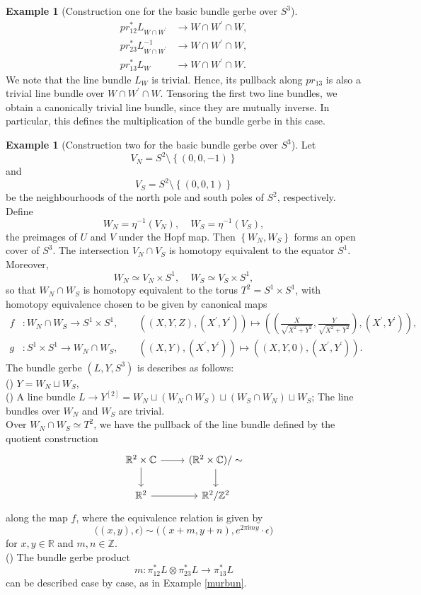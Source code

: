 \documentclass{article}
\theoremstyle{plain}
\theoremstyle{definition}
\newtheorem{exa}[thm]{Example}
\newcommand{\rNum}[1]{\lowercase\expandafter{\romannumeral #1\relax}}
\begin{document}
\begin{exa}[Construction one for the basic bundle gerbe over $S^3$]
\begin{align*}
pr_{12}^*L_{W \cap W^\prime} & \longrightarrow W \cap W^\prime \cap W, \\
pr_{23}^*L^{-1}_{W \cap W^\prime} & \longrightarrow W \cap W^\prime \cap W, \\
pr_{13}^*L_{W} & \longrightarrow W \cap W^\prime \cap W.
\end{align*}
We note that the line bundle $L_W$ is trivial. Hence, its pullback along $pr_{13}$ is also a trivial line bundle over $W \cap W^\prime \cap W$. Tensoring the first two line bundles, we obtain a canonically trivial line bundle, since they are mutually inverse. In particular, this defines the multiplication of the bundle gerbe in this case.
\end{exa}
\begin{exa}[Construction two for the basic bundle gerbe over $S^3$]\label{ourbun}
Let $$V_N = S^2 \setminus \left\{(0,0,-1)\right\}$$ and $$V_S = S^2 \setminus \left\{(0,0,1)\right\}$$ be the neighbourhoods of the north pole and south poles of $S^2$, respectively. Define
$$W_N = \eta^{-1}(V_N), ~~~~~ W_S = \eta^{-1}(V_S),$$
the preimages of $U$ and $V$ under the Hopf map. Then $\left\{W_N,W_S\right\}$ forms an open cover of $S^3$. The intersection $V_N \cap V_S$ is homotopy equivalent to the equator $S^1$. Moreover,
\[
W_N \simeq V_N \times S^1, ~~~~~ W_S \simeq V_S \times S^1,
\]
so that $W_N \cap W_S$ is homotopy equivalent to the torus $T^2 = S^1 \times S^1$, with homotopy equivalence chosen to be given by canonical maps
\begin{align*}
f &: W_N \cap W_S \longrightarrow S^1 \times S^1, \qquad
\left((X,Y,Z),(X^\prime,Y^\prime)\right) \longmapsto
\left(
(\frac{X}{\sqrt{X^2+Y^2}},
\frac{Y}{\sqrt{X^2+Y^2}}),
(X^\prime,Y^\prime)
\right), \\
g &: S^1 \times S^1 \longrightarrow W_N \cap W_S, \qquad
\left((X,Y),(X^\prime,Y^\prime)\right) \longmapsto \left((X,Y,0),(X^\prime,Y^\prime)\right).
\end{align*}
The bundle gerbe $(L,Y,S^3)$ is describes as follows: \\
(\rNum{1}) $Y = W_N \sqcup W_S$, \\
(\rNum{2}) A line bundle $L \longrightarrow Y^{[2]} = W_N \sqcup (W_N \cap W_S) \sqcup (W_S \cap W_N) \sqcup W_S$; The line bundles over $W_N$ and $W_S$ are trivial. \\
Over $W_N \cap W_S \simeq T^2$, we have the pullback of the line bundle defined by the quotient construction
\[
\begin{tikzcd}
\mathbb{R}^2 \times \mathbb{C} \arrow[r] \arrow[d] & (\mathbb{R}^2 \times \mathbb{C})/\sim \arrow[d] \\
\mathbb{R}^2 \arrow[r] & \mathbb{R}^2/\mathbb{Z}^2
\end{tikzcd}
\]
along the map $f$, where the equivalence relation is given by
$$\bigl((x,y),\epsilon\bigr) \sim \bigl((x+m,y+n),e^{2\pi \mathsf{i} my} \cdot \epsilon\bigr)$$ for $x,y \in \mathbb{R}$ and $m,n \in \mathbb{Z}$. \\
(\rNum{3}) The bundle gerbe product
\[
m:\pi_{12}^*L \otimes \pi_{23}^*L \longrightarrow \pi_{13}^*L
\]
can be described case by case, as in Example \ref{murbun}.
\end{exa}
\end{document}
